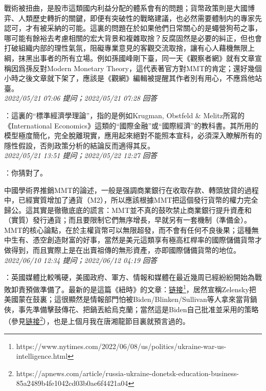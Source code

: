 \documentclass[twocolumn]{ctexart}
\begin{document}
戰術被扭曲，是股市這類國内利益分配的體系會有的問題；貨幣政策則是大國博弈、人類歷史轉折的關鍵，即便有突破性的戰略建議，也必然需要體制内的專家先認可，才有被采納的可能。這裏的問題在於如果他們日常關心的是蠅營狗苟之事，哪可能有餘裕去考慮相關的宏大背景和複雜取捨？反腐固然是必要的糾正，但也會打破組織内部的理性氣氛，阻礙專業意見的客觀交流取捨，讓有心人藉機無限上綱，抹黑出事者的所有立場。例如孫國峰剛下臺，同一天《觀察者網》就有文章宣稱因爲孫反對Modern Monetary Theory，這代表著官方對MMT的肯定；還好幾個小時之後文章就下架了，應該是《觀網》編輯被提醒其作者別有用心，不應爲他站臺。
\\

\textit{\hfill\noindent\small 2022/05/21 07:06 提问；2022/05/21 07:28 回答}

：這裏的“標準經濟學理論”，指的是例如Krugman, Obstfeld \& Melitz所寫的《International Economics》這類的“國際金融”或“國際經濟”的教科書。其所用的模型極度簡化，完全脫離現實，應用起來絕對不能照本宣科，必須深入瞭解所有的隱性假設，否則政策分析的結論反而適得其反。
\\

\textit{\hfill\noindent\small 2022/05/21 13:51 提问；2022/05/22 12:27 回答}

：你猜對了。

中國學術界推銷MMT的論述，一般是强調商業銀行在收取存款、轉頭放貸的過程中，已經實質增加了通貨（M2），所以應該根據MMT把這個發行貨幣的權力完全歸公。這其實是徹徹底底的謊言：MMT並不真的鼓吹禁止商業銀行提升資產和（實質）發行通貨；而且要限制它們無序增長，早就另有一套機制（準備金）。MMT的核心論點，在於主權貨幣可以無限超發，而不會有任何不良後果；這種無中生有、憑空創造財富的好事，當然是美元這類享有極高杠桿率的國際儲備貨幣才做得到，而且實際上是在出賣祖傳的無形資產，亦即國際儲備貨幣的地位。
\\

\textit{\hfill\noindent\small 2022/06/10 12:34 提问；2022/06/12 04:19 回答}

：英國媒體比較嘴硬，美國政府、軍方、情報和媒體在最近幾周已經紛紛開始為戰敗卸責預做準備了。最新的是這篇《紐時》的文章：\href{https://www.nytimes.com/2022/06/08/us/politics/ukraine-war-us-intelligence.html}{链接\footnote{\url{https://www.nytimes.com/2022/06/08/us/politics/ukraine-war-us-intelligence.html}}}，居然宣稱Zelensky把美國蒙在鼓裏；這很顯然是情報部門怕被Biden/Blinken/Sullivan等人拿來當背鍋俠，事先準備擊鼓傳花、把鍋丟給烏克蘭；當然這是Biden自己批准並采用的策略（參見\href{https://apnews.com/article/russia-ukraine-donetsk-education-business-85a2489b4fe1042cd03b0ae6f4421a04}{链接\footnote{\url{https://apnews.com/article/russia-ukraine-donetsk-education-business-85a2489b4fe1042cd03b0ae6f4421a04}}}），也是上個月我在唐湘龍節目裏就預言過的。
\\
\end{document}
